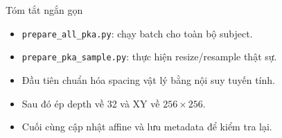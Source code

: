\documentclass[aspectratio=169]{beamer}
\begin{document}
\begin{frame}{Tóm tắt ngắn gọn}
  \begin{itemize}
    \item \texttt{prepare\_all\_pka.py}: chạy batch cho toàn bộ subject.
    \item \texttt{prepare\_pka\_sample.py}: thực hiện resize/resample thật sự.
    \item Đầu tiên chuẩn hóa spacing vật lý bằng nội suy tuyến tính.
    \item Sau đó ép depth về 32 và XY về \(256 \times 256\).
    \item Cuối cùng cập nhật affine và lưu metadata để kiểm tra lại.
  \end{itemize}
\end{frame}
\end{document}
